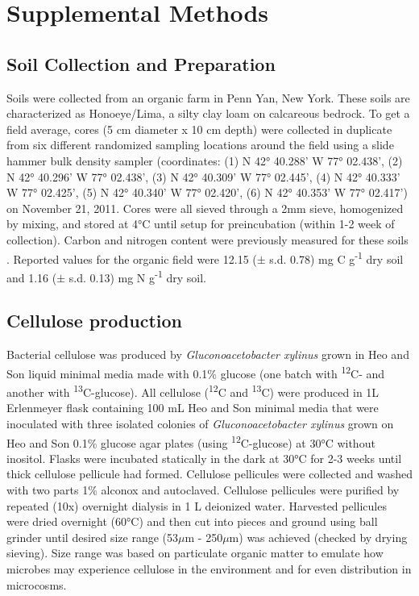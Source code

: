 \section{Supplemental Methods}
\subsection{Soil Collection and Preparation}
Soils were collected from an organic farm in Penn Yan, New York.  These soils
are characterized as Honoeye/Lima, a silty clay loam on calcareous bedrock. To
get a field average, cores (5 cm diameter x 10 cm depth) were collected in
duplicate from six different randomized sampling locations around the field
using a slide hammer bulk density sampler (coordinates: (1) N 42° 40.288’ W 77°
02.438’, (2) N 42° 40.296’ W 77° 02.438’, (3) N 42° 40.309’ W 77° 02.445’, (4)
N 42° 40.333’ W 77° 02.425’, (5) N 42° 40.340’ W 77° 02.420’, (6) N 42° 40.353’
W 77° 02.417’) on November 21, 2011. Cores were all sieved through a 2mm sieve,
homogenized by mixing, and stored at 4°C until setup for preincubation (within
1-2 week of collection).  Carbon and nitrogen content were previously measured
for these soils \cite{Berthrong_2013}. Reported values for the organic field
were 12.15 ($\pm$ s.d. 0.78) mg C g\textsuperscript{-1} dry soil and 1.16
($\pm$ s.d. 0.13) mg N g\textsuperscript{-1} dry soil.



\subsection{Cellulose production}
Bacterial cellulose was produced by \textit{Gluconoacetobacter xylinus} grown
in Heo and Son \cite{Heo_2002} liquid minimal media made with 0.1\% glucose
(one batch with \textsuperscript{12}C- and another with
\textsuperscript{13}C-glucose). All cellulose (\textsuperscript{12}C and
\textsuperscript{13}C) were produced in 1L Erlenmeyer flask containing 100 mL
Heo and Son minimal media that were inoculated with three isolated colonies of
\textit{Gluconoacetobacter xylinus} grown on Heo and Son 0.1\% glucose agar
plates (using \textsuperscript{12}C-glucose) at 30°C without inositol. Flasks
were incubated statically in the dark at 30°C for 2-3 weeks until thick
cellulose pellicule had formed.  Cellulose pellicules were collected and washed
with two parts 1\% alconox and autoclaved. Cellulose pellicules were purified
by repeated (10x) overnight dialysis in 1 L deionized water. Harvested
pellicules were dried overnight (60°C) and then cut into pieces and ground
using ball grinder until desired size range (53$\mu$m - 250$\mu$m) was achieved
(checked by drying sieving). Size range was based on particulate organic matter
to emulate how microbes may experience cellulose in the environment
\cite{Cambardella_1992} and for even distribution in microcosms. 


